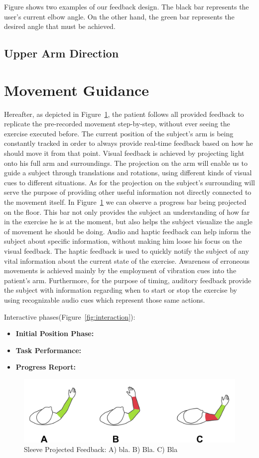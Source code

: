 
Figure  shows two examples of our feedback design. The black bar represents the user's current elbow angle. On the other hand, the green bar represents the desired angle that must be achieved. 

\subsection{Upper Arm Direction}


\section{Movement Guidance}
Hereafter, as depicted in Figure~\ref{fig:vision}, 
the patient follows all provided feedback to replicate the pre-recorded movement step-by-step, without ever seeing the exercise executed before.
The current position of the subject's arm is being constantly tracked in order to always provide real-time 
feedback based on how he should move it from that point.
Visual feedback is achieved by projecting light onto his full arm and surroundings. The projection on the arm will enable us to 
guide a subject through translations and rotations, using different kinds of visual cues to different situations. As for the projection on the subject's surrounding 
will serve the purpose of providing other useful information not directly connected to the movement itself. 
In Figure~\ref{fig:vision} we can observe a progress bar being projected on the floor. 
This bar not only provides the subject an understanding of how far in the exercise he is at the moment, but also helps the subject visualize the angle of movement he should be doing.
Audio and haptic feedback can help inform the subject about specific information, without making him loose his focus on the visual feedback.
The haptic feedback is used to quickly notify the subject of any vital information about the current state of the exercise. 
Awareness of erroneous movements is achieved mainly by the employment of vibration cues into the patient's arm.
Furthermore, for the purpose of timing, auditory feedback provide the subject with information regarding when to start or stop the exercise by using recognizable audio cues which represent those same actions.

Interactive phases(Figure~\ref{fig:interaction}):
\begin{itemize}
\item {\bf Initial Position Phase:}
\item {\bf Task Performance:}
\item {\bf Progress Report:}
\end{itemize}



\begin{figure}[!b]
    \begin{center}
        \includegraphics[width=\columnwidth]{imgs/visualfeedback.png}
    \end{center}
    \caption{Sleeve Projected Feedback: A) bla. B) Bla. C) Bla}
    \label{fig:vision}
\end{figure}